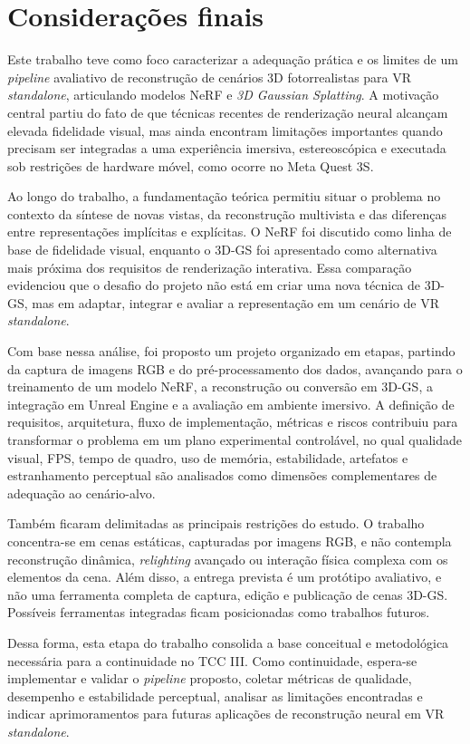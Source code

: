 \chapter{Considerações finais}

Este trabalho teve como foco caracterizar a adequação prática e os limites de um \textit{pipeline} avaliativo de reconstrução de cenários 3D fotorrealistas para VR \textit{standalone}, articulando modelos NeRF e \textit{3D Gaussian Splatting}. A motivação central partiu do fato de que técnicas recentes de renderização neural alcançam elevada fidelidade visual, mas ainda encontram limitações importantes quando precisam ser integradas a uma experiência imersiva, estereoscópica e executada sob restrições de hardware móvel, como ocorre no Meta Quest 3S.

Ao longo do trabalho, a fundamentação teórica permitiu situar o problema no contexto da síntese de novas vistas, da reconstrução multivista e das diferenças entre representações implícitas e explícitas. O NeRF foi discutido como linha de base de fidelidade visual, enquanto o 3D-GS foi apresentado como alternativa mais próxima dos requisitos de renderização interativa. Essa comparação evidenciou que o desafio do projeto não está em criar uma nova técnica de 3D-GS, mas em adaptar, integrar e avaliar a representação em um cenário de VR \textit{standalone}.

Com base nessa análise, foi proposto um projeto organizado em etapas, partindo da captura de imagens RGB e do pré-processamento dos dados, avançando para o treinamento de um modelo NeRF, a reconstrução ou conversão em 3D-GS, a integração em Unreal Engine e a avaliação em ambiente imersivo. A definição de requisitos, arquitetura, fluxo de implementação, métricas e riscos contribuiu para transformar o problema em um plano experimental controlável, no qual qualidade visual, FPS, tempo de quadro, uso de memória, estabilidade, artefatos e estranhamento perceptual são analisados como dimensões complementares de adequação ao cenário-alvo.

Também ficaram delimitadas as principais restrições do estudo. O trabalho concentra-se em cenas estáticas, capturadas por imagens RGB, e não contempla reconstrução dinâmica, \textit{relighting} avançado ou interação física complexa com os elementos da cena. Além disso, a entrega prevista é um protótipo avaliativo, e não uma ferramenta completa de captura, edição e publicação de cenas 3D-GS. Possíveis ferramentas integradas ficam posicionadas como trabalhos futuros.

Dessa forma, esta etapa do trabalho consolida a base conceitual e metodológica necessária para a continuidade no TCC III. Como continuidade, espera-se implementar e validar o \textit{pipeline} proposto, coletar métricas de qualidade, desempenho e estabilidade perceptual, analisar as limitações encontradas e indicar aprimoramentos para futuras aplicações de reconstrução neural em VR \textit{standalone}.
